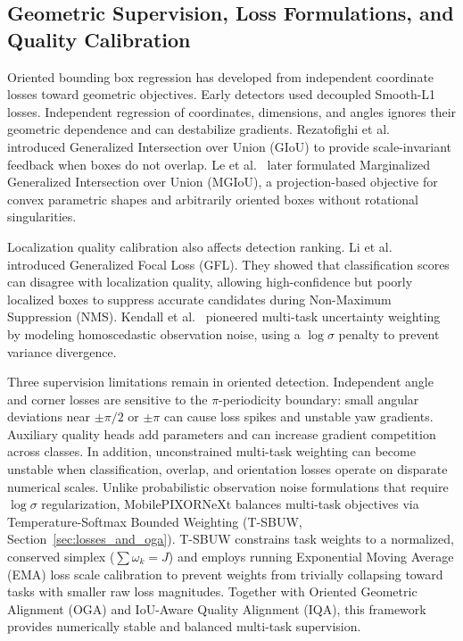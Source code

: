 \subsection{Geometric Supervision, Loss Formulations, and Quality Calibration}
\label{sec:rel_supervision_losses}

Oriented bounding box regression has developed from independent coordinate losses toward geometric objectives. Early detectors used decoupled Smooth-L1 losses. Independent regression of coordinates, dimensions, and angles ignores their geometric dependence and can destabilize gradients. Rezatofighi et al.~\cite{rezatofighi2019giou} introduced Generalized Intersection over Union (GIoU) to provide scale-invariant feedback when boxes do not overlap. Le et al.~\cite{le2026mgiou} later formulated Marginalized Generalized Intersection over Union (MGIoU), a projection-based objective for convex parametric shapes and arbitrarily oriented boxes without rotational singularities.

Localization quality calibration also affects detection ranking. Li et al.~\cite{li2020gfl} introduced Generalized Focal Loss (GFL). They showed that classification scores can disagree with localization quality, allowing high-confidence but poorly localized boxes to suppress accurate candidates during Non-Maximum Suppression (NMS). Kendall et al.~\cite{kendall2018uncertainty} pioneered multi-task uncertainty weighting by modeling homoscedastic observation noise, using a $\log \sigma$ penalty to prevent variance divergence.

Three supervision limitations remain in oriented detection. Independent angle and corner losses are sensitive to the $\pi$-periodicity boundary: small angular deviations near $\pm \pi/2$ or $\pm \pi$ can cause loss spikes and unstable yaw gradients. Auxiliary quality heads add parameters and can increase gradient competition across classes. In addition, unconstrained multi-task weighting can become unstable when classification, overlap, and orientation losses operate on disparate numerical scales. Unlike probabilistic observation noise formulations that require $\log \sigma$ regularization, MobilePIXORNeXt balances multi-task objectives via Temperature-Softmax Bounded Weighting (T-SBUW, Section~\ref{sec:losses_and_oga}). T-SBUW constrains task weights to a normalized, conserved simplex ($\sum \omega_k = J$) and employs running Exponential Moving Average (EMA) loss scale calibration to prevent weights from trivially collapsing toward tasks with smaller raw loss magnitudes. Together with Oriented Geometric Alignment (OGA) and IoU-Aware Quality Alignment (IQA), this framework provides numerically stable and balanced multi-task supervision.
